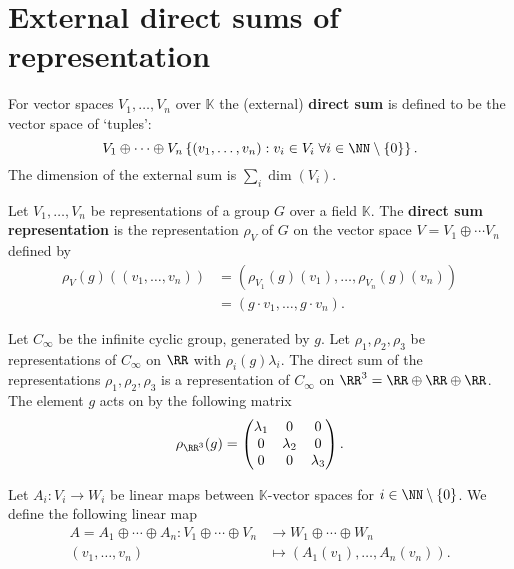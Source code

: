 \documentclass[12pt, a4paper]{article}
\newcommand{\KK}{\mathbb{K}}
\begin{document}
\section{External direct sums of representation}

\begin{definition}
    For vector spaces \(V_1,\ldots,V_n\) over \(\KK\) the (external) \textbf{direct sum} is defined to be the vector space of `tuples':
    \[V_1 \oplus \cdots \oplus V_n \left\{ (v_1,\ldots,v_n) : v_i \in V_i \; \forall i \in \NN\setminus \{0\} \right\}.\]
    The dimension of the external sum is \(\sum_i \dim(V_i)\).
\end{definition}

\begin{definition}
    Let \(V_1,\ldots,V_n\) be representations of a group \(G\) over a field \(\KK\). The \textbf{direct sum representation} is the representation \(\rho_V\) of \(G\) on the vector space \(V= V_1\oplus \cdots V_n\) defined by 
    \[\begin{aligned}
        \rho_V(g)((v_1,\ldots,v_n)) &= (\rho_{V_1}(g)(v_1),\ldots,\rho_{V_n}(g)(v_n)) \\
        &= (g\cdot v_1,\ldots,g\cdot v_n).
    \end{aligned}\]
\end{definition}

\begin{example}
    Let \(C_{\infty}\) be the infinite cyclic group, generated by \(g\). Let \(\rho_1,\rho_2,\rho_3\) be representations of \(C_{\infty}\) on \(\RR\) with \(\rho_i(g)\lambda_i\). The direct sum of the representations \(\rho_1,\rho_2,\rho_3\) is a representation of \(C_{\infty}\) on \(\RR^3 = \RR \oplus \RR \oplus \RR\). The element \(g\) acts on by the following matrix 
    \[\rho_{\RR^3}(g) = \begin{pmatrix}
        \lambda_1 & 0 & 0 \\
        0 & \lambda_2 & 0 \\
        0 & 0 & \lambda_3 \\
    \end{pmatrix}.\]
\end{example}

\begin{definition}
    Let \(A_i:V_i \to W_i\) be linear maps between \(\KK\)-vector spaces for \(i \in \NN\setminus\left\{ 0 \right\}\). We define the following linear map 
    \[\begin{aligned}
        A = A_1 \oplus \cdots \oplus A_n : V_1 \oplus \cdots \oplus V_n &\to W_1 \oplus \cdots \oplus W_n \\
        (v_1,\ldots,v_n) &\mapsto (A_1(v_1),\ldots,A_n(v_n)).
    \end{aligned}\] 
\end{definition}
\end{document}
